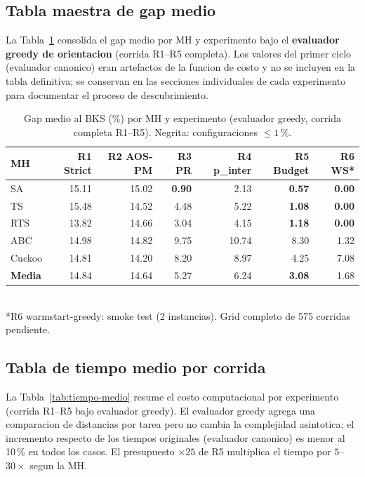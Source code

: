 \subsection{Tabla maestra de gap medio}

La Tabla~\ref{tab:comparativa-global} consolida el gap medio por MH y
experimento bajo el \textbf{evaluador greedy de orientacion} (corrida
R1--R5 completa). Los valores del primer ciclo (evaluador canonico)
eran artefactos de la funcion de costo y no se incluyen en la tabla
definitiva; se conservan en las secciones individuales de cada
experimento para documentar el proceso de descubrimiento.

\begin{table}[h]
\centering
\caption{Gap medio al BKS (\%) por MH y experimento (evaluador greedy,
         corrida completa R1--R5). Negrita: configuraciones $\leq 1$\,\%.}
\label{tab:comparativa-global}
\small
\begin{tabular}{lrrrrrr}
\toprule
MH & R1 Strict & R2 AOS-PM & R3 PR & R4 p\_inter & R5 Budget & R6 WS* \\
\midrule
SA      & 15.11 & 15.02 & \textbf{0.90} & 2.13 & \textbf{0.57} & \textbf{0.00} \\
TS      & 15.48 & 14.52 & 4.48          & 5.22 & \textbf{1.08} & \textbf{0.00} \\
RTS     & 13.82 & 14.66 & 3.04          & 4.15 & \textbf{1.18} & \textbf{0.00} \\
ABC     & 14.98 & 14.82 & 9.75          & 10.74 & 8.30         & 1.32 \\
Cuckoo  & 14.81 & 14.20 & 8.20          & 8.97  & 4.25         & 7.08 \\
\midrule
\textbf{Media} & 14.84 & 14.64 & 5.27 & 6.24 & \textbf{3.08} & 1.68 \\
\bottomrule
\end{tabular}
\\[4pt]
\footnotesize
*R6 warmstart-greedy: smoke test (2 instancias). Grid completo de 575 corridas pendiente.
\end{table}

\subsection{Tabla de tiempo medio por corrida}

La Tabla~\ref{tab:tiempo-medio} resume el costo computacional por
experimento (corrida R1--R5 bajo evaluador greedy). El evaluador greedy
agrega una comparacion de distancias por tarea pero no cambia la
complejidad asintotica; el incremento respecto de los tiempos originales
(evaluador canonico) es menor al 10\,\% en todos los casos. El
presupuesto $\times 25$ de R5 multiplica el tiempo por
$5$--$30\times$ segun la MH.


